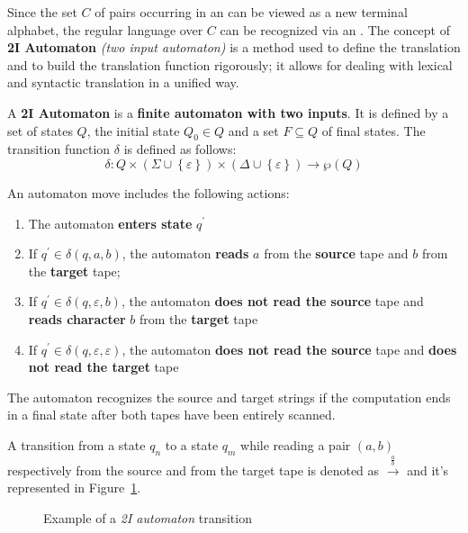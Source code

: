 \documentclass[english]{article}
\begin{document}
Since the set \(C\) of pairs occurring in an \rte can be viewed as a new terminal alphabet, the regular language over \(C\) can be recognized via an \FSA.
The concept of \textbf{2I Automaton} \textit{(two input automaton)} is a method used to define the translation and to build the translation function rigorously;
it allows for dealing with lexical and syntactic translation in a unified way.

\begin{definition}[2I Automaton]
  A \textbf{2I Automaton} is a \textbf{finite automaton with two inputs}.
  It is defined by a set of states \(Q\), the initial state \(Q_0 \in Q\) and a set \(F \subseteq Q\) of final states.
  The transition function \(\delta\) is defined as follows:
  \[ \delta : Q \times \left( \Sigma \cup \left\{ \varepsilon \right\} \right) \times \left( \Delta \cup \left\{ \varepsilon \right\} \right) \rightarrow \wp (Q) \]
\end{definition}

An automaton move includes the following actions:

\begin{enumerate}
  \item The automaton \textbf{enters state} \(q^\prime\)
  \item If \(q^\prime \in \delta(q, a, b)\), the automaton \textbf{reads} \(a\) from the \textbf{source} tape and \(b\) from the \textbf{target} tape;
  \item If \(q^\prime \in \delta(q, \varepsilon, b)\), the automaton \textbf{does not read the source} tape and \textbf{reads character} \(b\) from the \textbf{target} tape
  \item If \(q^\prime \in \delta(q, \varepsilon,\varepsilon)\), the automaton \textbf{does not read the source} tape and \textbf{does not read the target} tape
\end{enumerate}

The automaton recognizes the source and target strings if the computation ends in a final state after both tapes have been entirely scanned.

A transition from a state \(q_n\) to a state \(q_m\) while reading a pair \(\left( a, b \right)\) respectively from the source and from the target tape is denoted as \(\xrightarrow{\frac{a}{b}}\) and it's represented in Figure~\ref{fig:2I-automaton-transition-example}.

\begin{figure}[htbp]
  \centering
  \bigskip
  \caption{Example of a \textit{2I automaton} transition}
  \label{fig:2I-automaton-transition-example}
  \bigskip
\end{figure}
\end{document}
